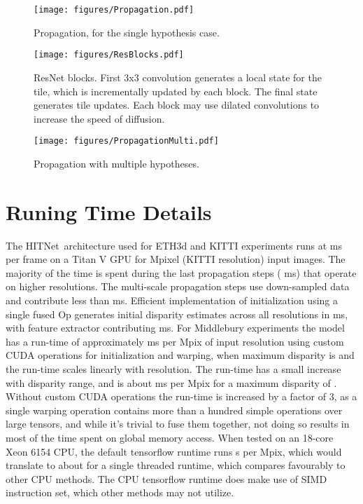 \documentclass[final]{cvpr}
\newcommand{\algoname}{HITNet}
\begin{document}
\begin{figure}[h]
\vspace{-10pt}
    \centering
    \texttt{[image: figures/Propagation.pdf]}
    \caption{Propagation, for the single hypothesis case.}
    \label{fig:propagation_single}
\end{figure}

\begin{figure}[h]
\vspace{-10pt}
    \centering
    \texttt{[image: figures/ResBlocks.pdf]}
    \caption{ResNet blocks. First 3x3 convolution generates a local state for the tile, which is incrementally updated by each block. The final state generates tile updates. Each block may use dilated convolutions to increase the speed of diffusion.}
    \label{fig:resblocks}
\end{figure}

\begin{figure}[h]
\vspace{-10pt}
    \centering
    \texttt{[image: figures/PropagationMulti.pdf]}
    \caption{Propagation with multiple hypotheses.}
    \label{fig:propagation_multi}
\end{figure}


\section{Runing Time Details}
The \algoname \ architecture used for ETH3d and KITTI experiments runs at ms per frame on a Titan V GPU for Mpixel (KITTI resolution) input images. The majority of the time is spent during the last  propagation steps ( ms) that operate on higher resolutions. The multi-scale propagation steps use down-sampled data and contribute less than ms. Efficient implementation of initialization using a single fused Op generates initial disparity estimates across all resolutions in ms, with feature extractor contributing ms.
For Middlebury experiments the model has a run-time of approximately ms per Mpix of input resolution using custom CUDA operations for initialization and warping, when maximum disparity is  and the run-time scales linearly with resolution. The run-time has a small increase with disparity range, and is about ms per Mpix for a maximum disparity of . Without custom CUDA operations the run-time is increased by a factor of 3, as a single warping operation contains more than a hundred simple operations over large tensors, and while it's trivial to fuse them together, not doing so results in most of the time spent on global memory access. When tested on an 18-core Xeon 6154 CPU, the default tensorflow runtime runs s per Mpix, which would translate to about  for a single threaded runtime, which compares favourably to other CPU methods. The CPU tensorflow runtime does make use of SIMD instruction set, which other methods may not utilize.
\end{document}
